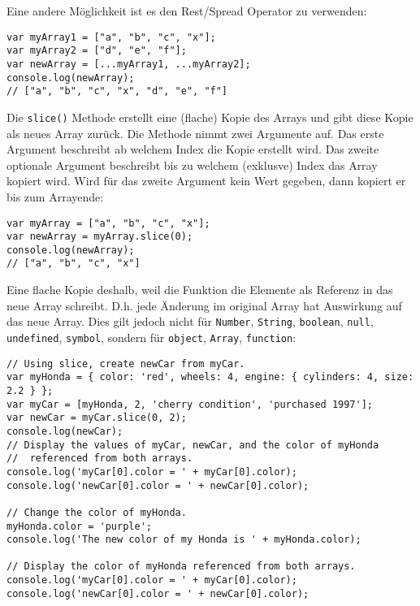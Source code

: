 \documentclass{book}
\begin{document}
Eine andere Möglichkeit ist es den Rest/Spread Operator zu verwenden:
\begin{lstlisting}[caption=Array Konstruktor]
var myArray1 = ["a", "b", "c", "x"];
var myArray2 = ["d", "e", "f"];
var newArray = [...myArray1, ...myArray2];
console.log(newArray);
// ["a", "b", "c", "x", "d", "e", "f"]
\end{lstlisting}

Die \lstinline|slice()| Methode erstellt eine (flache) Kopie des Arrays und gibt diese Kopie als neues Array zurück. Die Methode nimmt zwei Argumente auf. Das erste Argument beschreibt ab welchem Index die Kopie erstellt wird. Das zweite optionale Argument beschreibt bis zu welchem (exklusve) Index das Array kopiert wird. Wird für das zweite Argument kein Wert gegeben, dann kopiert er bis zum Arrayende:

\begin{lstlisting}[caption=Array Konstruktor]
var myArray = ["a", "b", "c", "x"];
var newArray = myArray.slice(0);
console.log(newArray);
// ["a", "b", "c", "x"]
\end{lstlisting}

Eine flache Kopie deshalb, weil die Funktion die Elemente als Referenz in das neue Array schreibt. D.h. jede Änderung im original Array hat Auswirkung auf das neue Array. Dies gilt jedoch nicht für \lstinline|Number|, \lstinline|String|, \lstinline|boolean|, \lstinline|null|, \lstinline|undefined|, \lstinline|symbol|, sondern für \lstinline|object|, \lstinline|Array|, \lstinline|function|:

\begin{lstlisting}[caption=Array Konstruktor]
// Using slice, create newCar from myCar.
var myHonda = { color: 'red', wheels: 4, engine: { cylinders: 4, size: 2.2 } };
var myCar = [myHonda, 2, 'cherry condition', 'purchased 1997'];
var newCar = myCar.slice(0, 2);
console.log(newCar);
// Display the values of myCar, newCar, and the color of myHonda
//  referenced from both arrays.
console.log('myCar[0].color = ' + myCar[0].color);
console.log('newCar[0].color = ' + newCar[0].color);

// Change the color of myHonda.
myHonda.color = 'purple';
console.log('The new color of my Honda is ' + myHonda.color);

// Display the color of myHonda referenced from both arrays.
console.log('myCar[0].color = ' + myCar[0].color);
console.log('newCar[0].color = ' + newCar[0].color);
\end{lstlisting}
\end{document}
